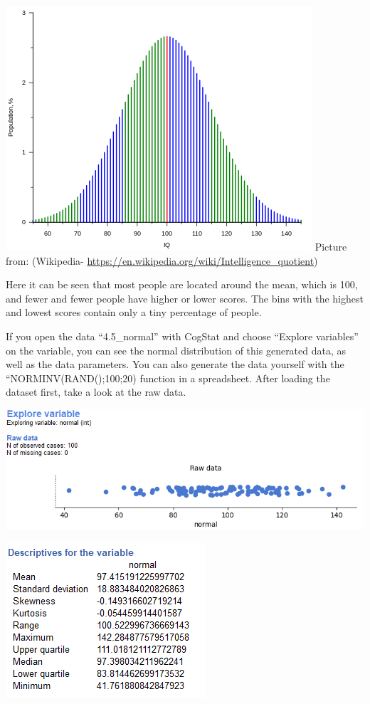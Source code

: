 \documentclass[
]{book}
\begin{document}
\includegraphics{img/ch4/4.5egiq.png}
Picture from: (Wikipedia- \url{https://en.wikipedia.org/wiki/Intelligence_quotient})

Here it can be seen that most people are located around the mean, which is 100, and fewer and fewer people have higher or lower scores. The bins with the highest and lowest scores contain only a tiny percentage of people.

If you open the data ``4.5\_normal'' with CogStat and choose ``Explore variables'' on the variable, you can see the normal distribution of this generated data, as well as the data parameters. You can also generate the data yourself with the ``NORMINV(RAND();100;20) function in a spreadsheet. After loading the dataset first, take a look at the raw data.

\includegraphics{img/ch4/4.5expvarraw.png}

\includegraphics{img/ch4/4.5expvarrawdescr.png}
\end{document}

